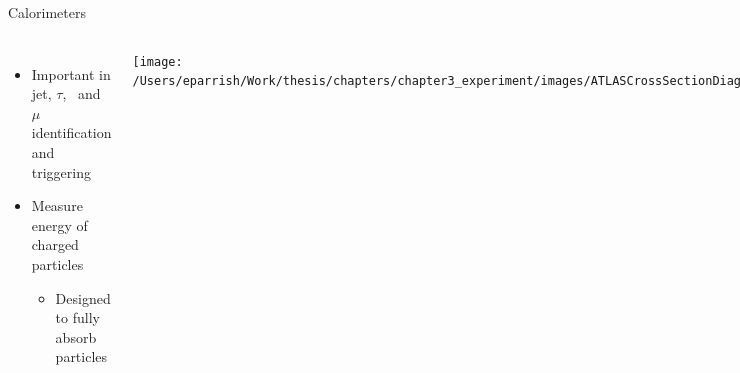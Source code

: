 \documentclass[aspectratio=169,xcolor=table]{beamer}
\begin{document}
    \begin{frame}[t]{Calorimeters}
     \begin{columns}[t]
        \begin{itemize}
          \item Important in jet, $\tau$, \Etm \, and $\mu$ identification and triggering
          \item Measure energy of charged particles
          \begin{itemize}
              \item Designed to fully absorb particles
          \end{itemize}
        \end{itemize}

      \centering
      \texttt{[image: /Users/eparrish/Work/thesis/chapters/chapter3\_experiment/images/ATLASCrossSectionDiagram.png]}

      \begin{figure}
        \begin{columns}
            \centering
            \texttt{[image: /Users/eparrish/Work/thesis/chapters/chapter3\_experiment/images/ATLAS\_Calorimeters\_Highlight\_Run2]}
            \caption{\tiny \cite{atlas-schematics}}
        \end{columns}
      \end{figure}
      \begin{figure}
        \texttt{[image: /Users/eparrish/Work/thesis/chapters/chapter3\_experiment/images/ATLAS\_Calorimeters\_Run2]}
        \caption{\tiny \cite{atlas-schematics}}
      \end{figure}
      \end{columns}
    \end{frame}
\end{document}
